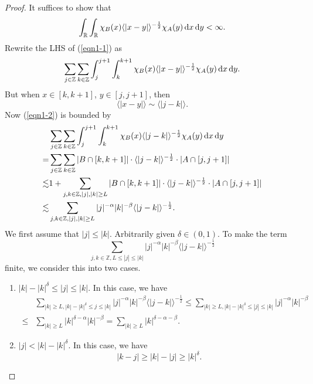 \documentclass[12pt]{amsart}
\def\d{{\,\rm d}}
\theoremstyle{definition}
\numberwithin{equation}{section}
\begin{document}
 \begin{proof}
    It suffices to show that 
    \begin{equation}
       \int_{\mathbb{R}}\int_{\mathbb{R}}\chi_B(x)\langle|x-y|\rangle^{-\frac{1}{2}}\chi_A(y)\d x\d y<\infty.\label{eqn1-1}
    \end{equation}
    Rewrite the LHS of (\ref{eqn1-1}) as
    \begin{equation}
       \sum_{j\in \mathbb{Z}}\sum_{k\in\mathbb{Z}}\int_j^{j+1}\int_k^{k+1}\chi_B(x)\langle|x-y|\rangle^{-\frac{1}{2}}\chi_A(y)\d x\d y.\label{eqn1-2}
    \end{equation}
    But when $x\in [k,k+1]$, $y\in[j,j+1]$, then
    $$
       \langle|x-y|\rangle\sim \langle|j-k|\rangle.
    $$
    Now (\ref{eqn1-2}) is bounded by 
    \begin{align}
       &\sum_{j\in \mathbb{Z}}\sum_{k\in\mathbb{Z}}\int_j^{j+1}\int_k^{k+1}\chi_B(x)\langle|j-k|\rangle^{-\frac{1}{2}}\chi_A(y)\d x\d y\notag\\
       =&\sum_{j\in\mathbb{Z}}\sum_{k\in\mathbb{Z}}|B\cap [k,k+1]|\cdot \langle|j-k|\rangle^{-\frac{1}{2}}\cdot |A\cap [j,j+1]|\notag\\
       \lesssim & 1+\sum_{j,k\in\mathbb{Z},|j|,|k|\ge L} |B\cap[k,k+1]|\cdot \langle|j-k|\rangle^{-\frac{1}{2}}\cdot|A\cap [j,j+1]|\notag\\
       \lesssim & \sum_{j,k\in\mathbb{Z},|j|,|k|\ge L} |j|^{-\alpha}|k|^{-\beta}\langle |j-k|\rangle^{-\frac{1}{2}}.\label{eqn1-3}
    \end{align}
    We first assume that  $|j|\le |k|$. 
    Arbitrarily given $\delta\in (0,1)$.
    To make the term 
    $$ 
       \sum_{j,k\in \mathbb{Z},L\le|j|\le |k|}|j|^{-\alpha}|k|^{-\beta}\langle|j-k|\rangle^{-\frac{1}{2}}
    $$
    finite,
    we consider this into two cases.
    \begin{enumerate}
     \item $|k|-|k|^\delta\le |j|\le |k|$. In this case, we have
     \begin{align*}
       &\sum_{|k|\ge L,|k|-|k|^\delta\le j\le |k|}|j|^{-\alpha}|k|^{-\beta}\langle |j-k|\rangle^{-\frac{1}{2}}
       \le  \sum_{|k|\ge L,|k|-|k|^\delta\le|j|\le |k|}|j|^{-\alpha}|k|^{-\beta}\\
       \le & \sum_{|k|\ge L}|k|^{\delta-\alpha}|k|^{-\beta}=\sum_{|k|\ge L}|k|^{\delta-\alpha-\beta}.
     \end{align*}
     \item $|j|<|k|-|k|^\delta$. In this case, we have 
     $$
        |k-j|\ge |k|-|j|\ge |k|^\delta.
$$
\end{enumerate}
\end{proof}
\end{document}
